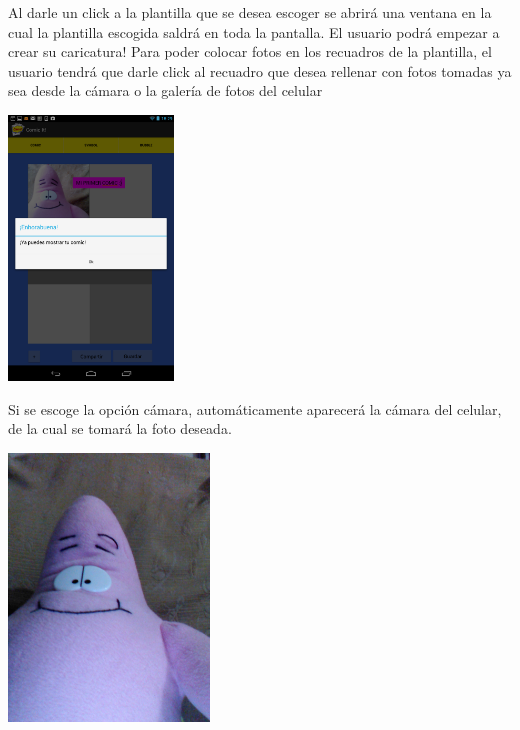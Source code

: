 \documentclass[12pt]{report}
\begin{document}

Al darle un click a la plantilla que se desea escoger se abrirá una ventana en la cual la plantilla escogida saldrá en toda la pantalla. El usuario podrá empezar a crear su caricatura!
Para poder colocar fotos en los recuadros de la plantilla, el usuario tendrá que darle click al recuadro que desea rellenar con fotos tomadas ya sea desde la cámara o la galería de fotos del celular
\newline

	\begin{center}
		\begingroup
			\includegraphics[width=0.33\textwidth]{imagenes_usuario/camara.png}
		\endgroup
	\end{center}

Si se escoge la opción cámara, automáticamente aparecerá la cámara del celular, de la cual se tomará la foto deseada.
\newline
	\begin{center}
		\begingroup
			\includegraphics[width=0.40\textwidth]{imagenes_usuario/foto.jpg}
		\endgroup
	\end{center}
\end{document}

